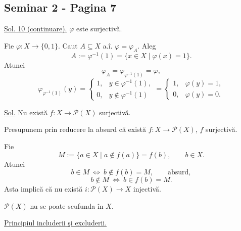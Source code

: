 
\subsection*{Seminar 2 - Pagina 7}

\noindent\underline{Sol. 10 (continuare).} $\varphi$ este surjectivă.

\noindent Fie $\varphi:X\longrightarrow\{0,1\}$. Caut $A\subseteq X$ a.î.
$\varphi=\varphi_A$. Aleg
\[
 A:=\varphi^{-1}(1)=\{x\in X\mid\varphi(x)=1\}.
\]
\noindent Atunci
\[
 \varphi_A=\varphi_{\varphi^{-1}(1)}=\varphi,
\]
\[
 \varphi_{\varphi^{-1}(1)}(y)=
 \begin{cases}
  1,& y\in\varphi^{-1}(1),\\
  0,& y\notin\varphi^{-1}(1)
 \end{cases}
 =
 \begin{cases}
  1,&\varphi(y)=1,\\
  0,&\varphi(y)=0.
 \end{cases}
\]

\bigskip
\noindent{}\quad\underline{Sol.} Nu există
$f:X\longrightarrow\mathcal{P}(X)$ surjectivă.

\noindent Presupunem prin reducere la absurd că există
$f:X\longrightarrow\mathcal{P}(X)$, $f$ surjectivă.

\noindent Fie
\[
 M:=\{a\in X\mid a\notin f(a)\}=f(b),\qquad b\in X.
\]
\noindent Atunci
\[
 b\in M\ \Longleftrightarrow\ b\notin f(b)=M,\qquad\text{absurd},
\]
\[
 b\notin M\ \Longleftrightarrow\ b\in f(b)=M.
\]
\noindent Asta implică că nu există
$i:\mathcal{P}(X)\longrightarrow X$ injectivă.

\noindent $\mathcal{P}(X)$ nu se poate scufunda în $X$.

\bigskip
\noindent\underline{Principiul includerii şi excluderii.}

